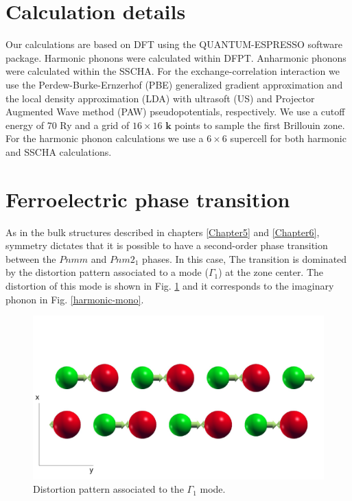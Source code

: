 \section{Calculation details}

Our calculations are based on DFT using the QUANTUM-ESPRESSO\cite{giannozzi2009quantum} software package. Harmonic 
phonons were calculated within DFPT. Anharmonic phonons were calculated within the SSCHA. For the 
exchange-correlation interaction we use the Perdew-Burke-Ernzerhof (PBE) generalized gradient approximation and the 
local density approximation (LDA) with ultrasoft (US) and Projector Augmented Wave method (PAW) pseudopotentials, 
respectively. We use a cutoff energy of 70 Ry and a grid of $16\times16$ $\boldsymbol{k}$ points to sample the first 
Brillouin zone. For the harmonic phonon calculations we use a $6\times6$ supercell for both harmonic and SSCHA 
calculations.

\section{Ferroelectric phase transition}

As in the bulk structures described in chapters \ref{Chapter5} and \ref{Chapter6}, 
symmetry\cite{orobengoa2009amplimodes,perez2010mode} dictates that it is possible to have a second-order phase 
transition between the $Pnmm$ and $Pnm2_{1}$ phases. In this case, The transition is dominated by the distortion 
pattern associated to a mode ($\Gamma_{1}$) at the zone center. The distortion of this 
mode is shown in Fig. \ref{transition-mono} and it corresponds to the imaginary phonon in 
Fig. \ref{harmonic-mono}. \\
\begin{figure}[h]
\includegraphics[width=\linewidth]{Figures/transition-mono.pdf}
	\caption{Distortion pattern associated to the $\Gamma_{1}$ mode.}
\label{transition-mono}
\end{figure}

